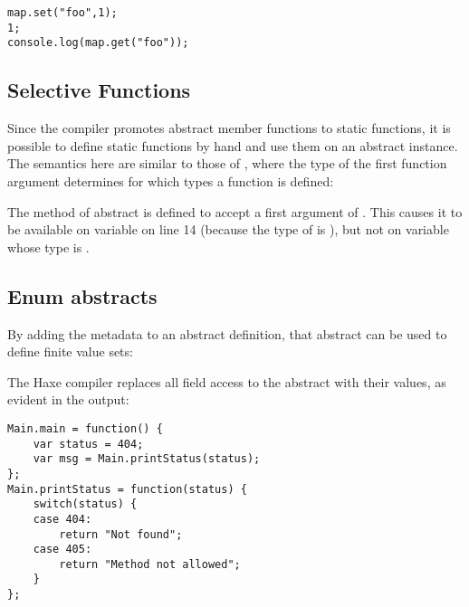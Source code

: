 \documentclass{haxe}
\begin{document}
\begin{lstlisting}
map.set("foo",1);
1;
console.log(map.get("foo"));
\end{lstlisting}


\subsection{Selective Functions}
\label{types-abstract-selective-functions}

Since the compiler promotes abstract member functions to static functions, it is possible to define static functions by hand and use them on an abstract instance. The semantics here are similar to those of , where the type of the first function argument determines for which types a function is defined:

The method  of abstract  is defined to accept a first argument of . This causes it to be available on variable  on line 14 (because the type of  is ), but not on variable  whose type is .



\subsection{Enum abstracts}
\label{types-abstract-enum}

By adding the  metadata to an abstract definition, that abstract can be used to define finite value sets:


The Haxe compiler replaces all field access to the  abstract with their values, as evident in the  output:

\begin{lstlisting}
Main.main = function() {
	var status = 404;
	var msg = Main.printStatus(status);
};
Main.printStatus = function(status) {
	switch(status) {
	case 404:
		return "Not found";
	case 405:
		return "Method not allowed";
	}
};
\end{lstlisting}
\end{document}
